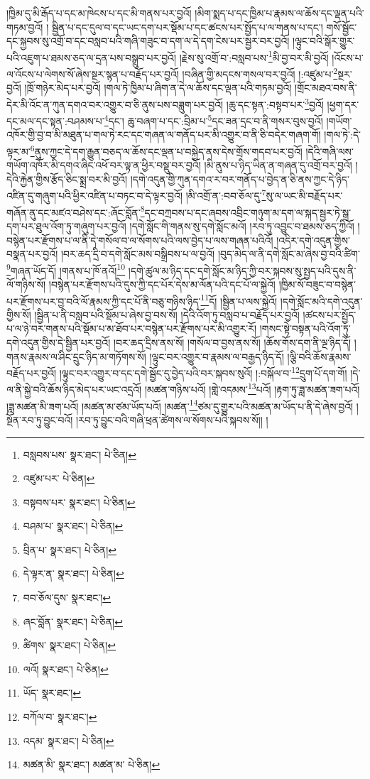 །ཁྱིམ་དུ་མི་རྒོད་པ་དང་མ་ཁེངས་པ་དང་མི་གནས་པར་བྱའོ། །མིག་སྨད་པ་དང་ཁྱིམ་པ་རྣམས་ལ་ཆོས་དང་ལྡན་པའི་གཏམ་བྱའོ། །
སྦྱིན་པ་དང་དུལ་བ་དང་ཡང་དག་པར་སྡོམ་པ་དང་ཚངས་པར་སྤྱོད་པ་ལ་གནས་པ་དང་། གསོ་སྦྱོང་དང་སྐྱབས་སུ་འགྲོ་བ་དང་བསླབ་པའི་གཞི་གཟུང་བ་དག་ལ་དེ་དག་ངེས་པར་སྦྱར་བར་བྱའོ། །ལྟུང་བའི་སྒོར་གྱུར་པའི་འཇུག་པ་ཐམས་ཅད་ལ་དྲན་པས་བསྒྲུབ་པར་བྱའོ། །རྗེས་སུ་འགྲོ་བ་:བསླབ་པས་\footnote{བསླབས་པས་  སྣར་ཐང་།  པེ་ཅིན། }མི་བྱ་བར་མི་བྱའོ། །འོངས་པ་ལ་འོངས་པ་ལེགས་སོ་ཞེས་སྔར་སྙན་པ་བརྗོད་པར་བྱའོ། །བཞིན་གྱི་མདངས་གསལ་བར་བྱའོ། །:འཛུམ་པ་\footnote{འཛུམ་པར་  པེ་ཅིན། }སྔར་བྱའོ། །ཁྲོ་གཉེར་མེད་པར་བྱའོ། །གལ་ཏེ་ཁྱིམ་པ་ཞིག་ན་དེ་ལ་ཆོས་དང་ལྡན་པའི་གཏམ་བྱའོ། །གྲོང་མཐའ་བས་ནི་དེར་མི་འོང་ན་ཀུན་དགའ་བར་འགྱུར་བ་ཅི་ནུས་པས་བཟླུག་པར་བྱའོ། །ཆུ་དང་སྟན་:བསྟབ་པར་\footnote{བསྟབས་པར་  སྣར་ཐང་།  པེ་ཅིན། }བྱའོ། །ཕྱག་དར་དང་མལ་དང་སྟན་:བཤམས་པ་\footnote{བཤམ་པ་  སྣར་ཐང་།  པེ་ཅིན། }དང་། ཆུ་བཞག་པ་དང་:བྲིམ་པ་\footnote{བྲིན་པ་  སྣར་ཐང་།  པེ་ཅིན། }དང་ཟན་དྲང་བ་ནི་གསར་བུས་བྱའོ། །གཡོག་འཁོར་གྱི་བྱ་བ་མི་མཐུན་པ་གལ་ཏེ་རང་དང་གཞན་ལ་གནོད་པར་མི་འགྱུར་བ་ནི་ཅི་བདེར་གཞག་གོ། །གལ་ཏེ་:དེ་ལྟར་མ་\footnote{དེ་ལྟར་ན་  སྣར་ཐང་།  པེ་ཅིན། }ནུས་ཀྱང་དེ་དག་རྒྱུན་བཅད་ལ་ཆོས་དང་ལྡན་པ་བསྐྱེད་ནས་དེས་གྲོས་གདབ་པར་བྱའོ། །དེའི་གཞི་ལས་གཡོག་འཁོར་མི་དགའ་ཞིང་འཕོ་བར་ལྟ་ན་ཕྱིར་བསྡུ་བར་བྱའོ། །མི་ནུས་པ་ཉིད་ཡིན་ན་གཞན་དུ་འགྲོ་བར་བྱའོ། །དེའི་རྐྱེན་གྱིས་རྩོད་ཅིང་སྨྲ་བར་མི་བྱའོ། །དགེ་འདུན་གྱི་ཀུན་དགའ་ར་བར་གནོད་པ་བྱེད་ན་ཅི་ནས་ཀྱང་དེ་ཉིད་འཛིན་དུ་གཞུག་པའི་ཕྱིར་འཛིན་པ་བཏང་བ་དེ་ལྟར་བྱའོ། །མི་འགྲོ་ན་:བབ་ཅོལ་དུ་\footnote{བབ་ཅོལ་དུས་  སྣར་ཐང་། }སུ་ལ་ཡང་མི་བརྗོད་པར་གཞོན་ནུ་དང་མཛའ་བཤེས་དང་:ཞོང་བློན་\footnote{ཞང་བློན་  སྣར་ཐང་།  པེ་ཅིན། }དང་བཀྲབས་པ་དང་ཞབས་འབྲིང་གཉུག་མ་དག་ལ་སྐད་སྦྱར་ཏེ་སྒྲ་དག་པར་ཐུལ་འོག་ཏུ་གཞུག་པར་བྱའོ། །དགེ་སློང་གི་གནས་སུ་དགེ་སློང་མའོ། །རབ་ཏུ་འབྱུང་བ་ཐམས་ཅད་ཀྱིའོ། །བསྙེན་པར་རྫོགས་པ་ལ་ནི་དེ་གསོལ་བ་ལ་སོགས་པའི་ལས་བྱེད་པ་ལས་གཞན་པའིའོ། །འདིར་དགེ་འདུན་གྱིས་བསྣན་པར་བྱའོ། །བར་ཆད་དྲི་བ་དགེ་སློང་མས་བསྒྲིབས་པ་ལ་བྱའོ། །བུད་མེད་ལ་ནི་དགེ་སློང་མ་ཞེས་བྱ་བའི་ཚིག་\footnote{ཚིགས་  སྣར་ཐང་།  པེ་ཅིན། }གཞན་ཡོད་དོ། །གནས་པ་ཁོ་ནའོ།\footnote{ལའོ།  སྣར་ཐང་།  པེ་ཅིན། } །དགེ་ཚུལ་མ་ཉིད་དང་དགེ་སློང་མ་ཉིད་ཀྱི་བར་སྐབས་སུ་སྤྱད་པའི་དུས་ནི་ལོ་གཉིས་སོ། །བསྙེན་པར་རྫོགས་པའི་དུས་ཀྱི་དང་པོར་དེས་མ་ལོན་པའི་དང་པོ་ལ་སྐྱེའོ། །ཁྱིམ་སོ་བཟུང་བ་བསྙེན་པར་རྫོགས་པར་བྱ་བའི་ལོ་རྣམས་ཀྱི་དང་པོ་ནི་བཅུ་གཉིས་ཉིད་\footnote{ཡོད་  སྣར་ཐང་། }དོ། །སྦྱིན་པ་ལས་སྐྱེའོ། །དགེ་སློང་མའི་དགེ་འདུན་གྱིས་སོ། །སྦྱིན་པ་ནི་བསླབ་པའི་སྡོམ་པ་ཞེས་བྱ་བས་སོ། །དེའི་འོག་ཏུ་བསླབ་པ་བརྗོད་པར་བྱའོ། །ཚངས་པར་སྤྱོད་པ་ལ་ཉེ་བར་གནས་པའི་སྡོམ་པ་མ་ཐོབ་པར་བསྙེན་པར་རྫོགས་པར་མི་འགྱུར་རོ། །གསང་སྟེ་བསྟན་པའི་འོག་ཏུ་དགེ་འདུན་གྱིས་དེ་སྦྱིན་པར་བྱའོ། །བར་ཆད་དྲིས་ནས་སོ། །གསོལ་བ་བྱས་ནས་སོ། །ཆོས་གོས་དག་ནི་ལྔ་ཉིད་དོ། །གནས་རྣམས་ལ་ཤིང་དྲུང་ཉིད་མ་གཏོགས་སོ། །ལྟུང་བར་འགྱུར་བ་རྣམས་ལ་བརྒྱད་ཉིད་དོ། །ལྕི་བའི་ཆོས་རྣམས་བརྗོད་པར་བྱའོ། །ལྟུང་བར་འགྱུར་བ་དང་དགེ་སྦྱོང་དུ་བྱེད་པའི་བར་སྐབས་སུའོ། །:བསྐོལ་བ་\footnote{བཀོལ་བ་  སྣར་ཐང་། }དྲུག་པོ་དག་གོ། །དེ་ལ་ནི་སྐྱེ་བའི་ཆོས་ཉིད་མེད་པར་ཡང་འདྲའོ། །མཚན་གཉིས་པའོ། །གླེ་འདམས་\footnote{འདམ་  སྣར་ཐང་།  པེ་ཅིན། }པའོ། །རྟག་ཏུ་ཟླ་མཚན་ཟག་པའོ། །ཟླ་མཚན་མི་ཟག་པའོ། །མཚན་མ་ཙམ་ཡོད་པའོ། །མཚན་\footnote{མཚན་མི་  སྣར་ཐང་། མཚན་མ་  པེ་ཅིན། }ཙམ་དུ་གྱུར་པའི་མཚན་མ་ཡོད་པ་ནི་དེ་ཞེས་བྱའོ། །སྔོན་རབ་ཏུ་བྱུང་བའོ། །རབ་ཏུ་བྱུང་བའི་གཞི་ཕྲན་ཚེགས་ལ་སོགས་པའི་སྐབས་སོ།། །
